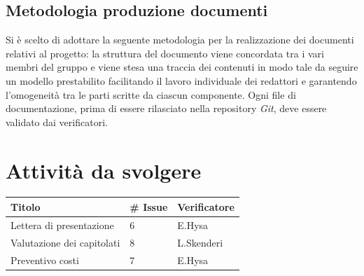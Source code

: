\documentclass{article}
\begin{document}
    \subsection{Metodologia produzione documenti}
        Si è scelto di adottare la seguente metodologia per la realizzazione dei documenti relativi al progetto: la struttura del documento viene concordata tra i vari membri del gruppo e viene stesa una traccia dei contenuti in modo tale da seguire un modello prestabilito facilitando il lavoro individuale dei redattori e garantendo l’omogeneità tra le parti scritte da ciascun componente. Ogni file di documentazione, prima di essere rilasciato nella repository \textit{Git}, deve essere validato dai verificatori.

\section{Attività da svolgere}
    \begin{center}
        \begin{tabular}{|C{7cm}|C{1,5cm}|C{3cm}|}
            \hline
            \textbf{Titolo} & \textbf{\# Issue} & \textbf{Verificatore} \\
            \hline\hline
            Lettera di presentazione & 6 & E.Hysa\\
            Valutazione dei capitolati & 8 & L.Skenderi\\ Preventivo costi & 7 & E.Hysa \\
            \hline
        \end{tabular}
    \end{center}
\end{document}
